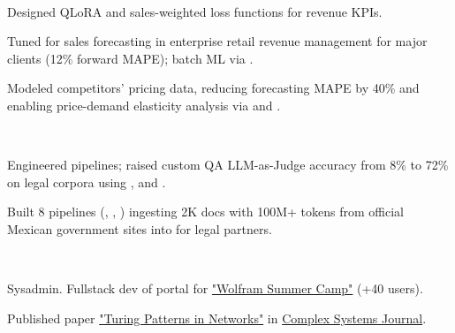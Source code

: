 \documentclass{tex/deedy-resume-openfont}
\begin{document}
\begin{minipage}[t]{0.67\textwidth}
\\
\begin{tightemize}
    \item Designed QLoRA and sales-weighted loss functions for revenue KPIs.
    \item Tuned   for sales forecasting in enterprise retail revenue management for major clients (12\% forward MAPE);  batch ML via .
    \item Modeled competitors' pricing data, reducing forecasting MAPE by 40\% and enabling price-demand elasticity analysis via  and .
\end{tightemize}
\sectionsep

\\
\begin{tightemize}
    \item Engineered  pipelines; raised custom QA LLM-as-Judge accuracy from 8\% to 72\% on legal corpora using ,  and .
    \item Built 8  pipelines (, , ) ingesting 2K docs with 100M+ tokens from official Mexican government sites into  for legal partners.
\end{tightemize}
\sectionsep

\\
\begin{tightemize}
    \item Sysadmin. Fullstack dev of portal for \href{https://www.notebookarchive.org/collection-pod?collection=wolfram-summer-school-2021}{"Wolfram Summer Camp"} (+40 users).
    \item Published paper \href{https://www.complex-systems.com/abstracts/v32_i03_a02/}{"Turing Patterns in Networks"} in \href{https://www.complex-systems.com/}{Complex Systems Journal}.
\end{tightemize}


\end{minipage}
\end{document}
